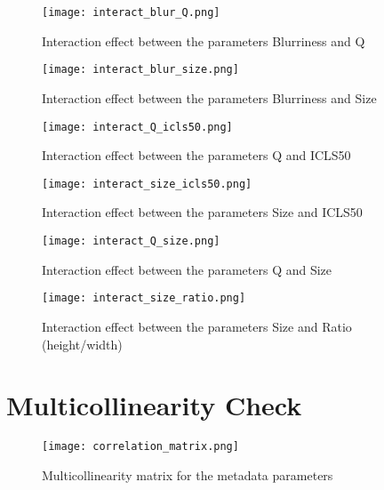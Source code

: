\documentclass[12pt]{article}
\begin{document}
\begin{figure}[h]
	\begin{center}
		\texttt{[image: interact\_blur\_Q.png]}
	\end{center}
	\caption{Interaction effect between the parameters Blurriness and Q}
	\label{fig:interact_blur_Q}
\end{figure}

\begin{figure}[h]
	\begin{center}
		\texttt{[image: interact\_blur\_size.png]}
	\end{center}
	\caption{Interaction effect between the parameters Blurriness and Size}
	\label{fig:interact_blur_size}
\end{figure}

\begin{figure}[h]
	\begin{center}
		\texttt{[image: interact\_Q\_icls50.png]}
	\end{center}
	\caption{Interaction effect between the parameters Q and ICLS50}
	\label{fig:interact_Q_icls50}
\end{figure}

\begin{figure}[h]
	\begin{center}
		\texttt{[image: interact\_size\_icls50.png]}
	\end{center}
	\caption{Interaction effect between the parameters Size and ICLS50 }
	\label{fig:interact_size_icls50}
\end{figure}

\begin{figure}[h]
	\begin{center}
		\texttt{[image: interact\_Q\_size.png]}
	\end{center}
	\caption{Interaction effect between the parameters Q and Size}
	\label{fig:interact_Q_size}
\end{figure}

\begin{figure}[h]
	\begin{center}
		\texttt{[image: interact\_size\_ratio.png]}
	\end{center}
	\caption{Interaction effect between the parameters Size and Ratio (height/width)}
	\label{fig:interact_size_ratio}
\end{figure}

\clearpage
\section{Multicollinearity Check}\label{Amulticol}

\begin{sidewaysfigure}[h]
    \centering
	\begin{center}
		\texttt{[image: correlation\_matrix.png]}
	\end{center}
	\caption{Multicollinearity matrix for the metadata parameters}
	\label{fig:multicol}
\end{sidewaysfigure}
\end{document}

